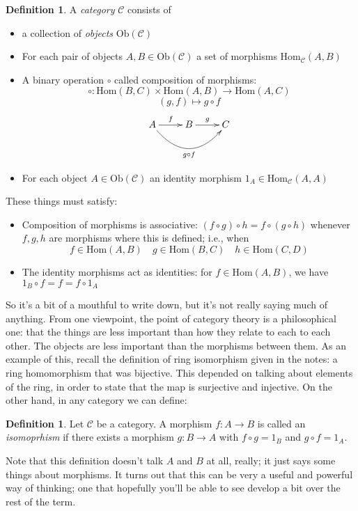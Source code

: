 \documentclass{amsart}
\theoremstyle{definition}
\newtheorem{definition}[dummy]{Definition}
\begin{document}
\begin{definition}

A \emph{category} $\mathcal{C}$ consists of 
\begin{itemize}
  \item  a collection of \emph{objects} $\textrm{Ob}(\mathcal{C})$
 \item For each pair of objects $A,B\in\textrm{Ob}(\mathcal{C})$ a set of morphisms $\textrm{Hom}_{\mathcal{C}}(A,B)$
\item A binary operation $\circ$ called composition of morphisms:
$$\circ:\textrm{Hom}(B,C)\times\textrm{Hom}(A,B)\to\textrm{Hom}(A,C)$$
$$(g,f)\mapsto g\circ f$$
$$\xymatrix{ A \ar@/_2pc/[rr]_{g\circ f} \ar[r]^f &B \ar[r]^g &C}$$
\item  For each object $A\in\textrm{Ob}(\mathcal{C})$ an identity morphism $1_A\in\textrm{Hom}_{\mathcal{C}}(A,A)$
 \end{itemize}
These things must satisfy:
\begin{itemize}
\item  Composition of morphisms is associative:  $(f\circ g)\circ h=f\circ (g\circ h)$ whenever $f,g,h$ are morphisms where this is defined; i.e., when
$$f\in \mathrm{Hom}(A,B)\quad g\in \mathrm{Hom}(B,C)\quad h\in \textrm{Hom}(C,D)$$
 \item The identity morphisms act as identities: for $f\in \textrm{Hom}(A,B)$, we have  $1_B\circ f=f=f\circ 1_A$
\end{itemize}

So it's a bit of a mouthful to write down, but it's not really saying much of anything.  From one viewpoint, the point of category theory is a philosophical one: that the things are less important than how they relate to each to each other.  The objects are less important than the morphisms between them.  As an example of this, recall the definition of ring isomorphism given in the notes: a ring homomorphism that was bijective.  This depended on talking about elements of the ring, in order to state that the map is surjective and injective.  On the other hand, in any category we can define:

\begin{definition} Let $\mathcal{C}$ be a category.  A morphism $f:A\to B$ is called an \emph{isomoprhism} if there exists a morphism $g:B\to A$ with $f\circ g=1_B$ and $g\circ f=1_A$.
\end{definition}

Note that this definition doesn't talk $A$ and $B$ at all, really; it just says some things about morphisms.  It turns out that this can be very a useful and powerful way of thinking; one that hopefully you'll be able to see develop a bit over the rest of the term.


\end{definition}
\end{document}
